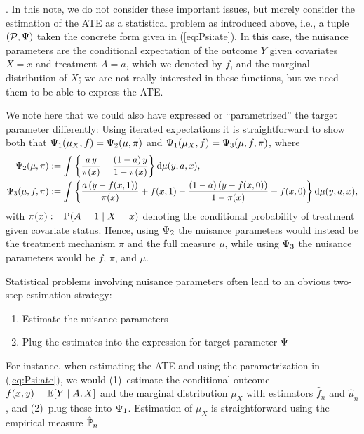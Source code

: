\documentclass[a4,danish]{article}
\begin{document}
. In this note, we do
not consider these important issues, but merely consider the estimation of the ATE as a statistical
problem as introduced above, i.e., a tuple $(\mathcal{P}, \TT)$ taken the concrete form given in
(\ref{eq:Psi:ate}). In this case, the nuisance parameters are the conditional expectation of the
outcome $Y$ given covariates $X=x$ and treatment $A=a$, which we denoted by $f$, and the marginal
distribution of $X$; we are not really interested in these functions, but we need them to be able to
express the ATE.

We note here that we could also have expressed or ``parametrized'' the target parameter differently:
Using iterated expectations it is straightforward to show both that
$\TT_1(\mu_X, f) = \TT_2(\mu, \pi)$ and $\TT_1(\mu_X, f) = \TT_3(\mu, f, \pi)$, where
\begin{align*}
  \TT_2(\mu, \pi) & := \int 
                    \left\{
                    \frac{a\,y}{\pi(x)} - \frac{(1-a)\,y}{1-\pi(x)} 
                    \right\}\diff \mu(y,a,x),\\
  \TT_3(\mu, f, \pi) &:=
                       \int 
                       \left\{
                       \frac{a\,(y-f(x,1))}{\pi(x)} + f(x,1) - \frac{(1-a)\,(y-f(x,0))}{1-\pi(x)} - f(x,0)
                       \right\}\diff \mu(y,a,x),
\end{align*}
with $\pi(x) := \P(A=1 \mid X=x)$ denoting the conditional probability of treatment given covariate
status. Hence, using $\TT_2$ the nuisance parameters would instead be the treatment mechanism $\pi$
and the full measure $\mu$, while using $\TT_3$ the nuisance parameters would be $f$, $\pi$, and
$\mu$.

Statistical problems involving nuisance parameters often lead to an obvious two-step estimation
strategy:
\begin{enumerate}[label=(\arabic*), topsep=0pt]
\item Estimate the nuisance parameters
\item Plug the estimates into the expression for target parameter $\TT$
\end{enumerate}
For instance, when estimating the ATE and using the parametrization in (\ref{eq:Psi:ate}), we would
(1)~estimate the conditional outcome $f(x,y) =\E[Y \mid A, X]$ and the marginal distribution $\mu_X$
with estimators $\hat{f}_n$ and $\hat{\mu}_n$, and (2)~plug these into $\TT_1$. Estimation of
$\mu_X$ is straightforward using the empirical measure $\empmeas$
\end{document}
